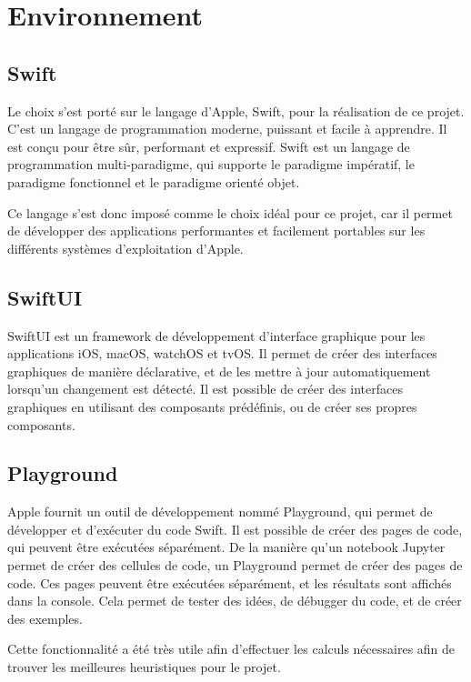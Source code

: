 \chapter{Environnement}

\section{Swift}
Le choix s'est porté sur le langage d'Apple, Swift, pour la réalisation de ce projet. C'est un langage de programmation moderne, puissant et facile à apprendre. Il est conçu pour être sûr, performant et expressif. Swift est un langage de programmation multi-paradigme, qui supporte le paradigme impératif, le paradigme fonctionnel et le paradigme orienté objet.

Ce langage s'est donc imposé comme le choix idéal pour ce projet, car il permet de développer des applications performantes et facilement portables sur les différents systèmes d'exploitation d'Apple.

\section{SwiftUI}
SwiftUI est un framework de développement d'interface graphique pour les applications iOS, macOS, watchOS et tvOS. Il permet de créer des interfaces graphiques de manière déclarative, et de les mettre à jour automatiquement lorsqu'un changement est détecté. Il est possible de créer des interfaces graphiques en utilisant des composants prédéfinis, ou de créer ses propres composants.

\section{Playground}
Apple fournit un outil de développement nommé Playground, qui permet de développer et d'exécuter du code Swift. Il est possible de créer des pages de code, qui peuvent être exécutées séparément. De la manière qu'un notebook Jupyter permet de créer des cellules de code, un Playground permet de créer des pages de code. Ces pages peuvent être exécutées séparément, et les résultats sont affichés dans la console. Cela permet de tester des idées, de débugger du code, et de créer des exemples.

Cette fonctionnalité a été très utile afin d'effectuer les calculs nécessaires afin de trouver les meilleures heuristiques pour le projet.

